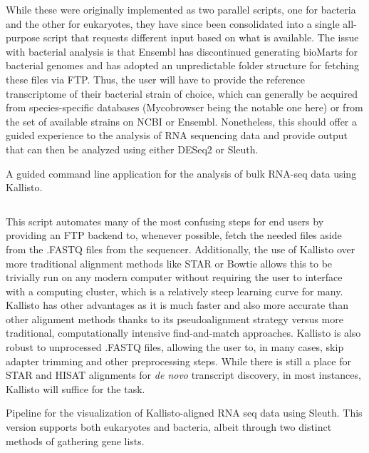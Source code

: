 While these were originally implemented as two parallel scripts, one for bacteria and the other for eukaryotes, they have since been consolidated into a single all-purpose script that requests different input based on what is available. The issue with bacterial analysis is that Ensembl has discontinued generating bioMarts for bacterial genomes and has adopted an unpredictable folder structure for fetching these files via FTP. Thus, the user will have to provide the reference transcriptome of their bacterial strain of choice, which can generally be acquired from species-specific databases (Mycobrowser being the notable one here) or from the set of available strains on NCBI or Ensembl. Nonetheless, this should offer a guided experience to the analysis of RNA sequencing data and provide output that can then be analyzed using either DESeq2 or Sleuth.

\begin{code}
\caption{A guided command line application for the analysis of bulk RNA-seq data using Kallisto.}
\label{blinder}

\inputminted[breaklines,frame=single,fontsize=\small]{python}{source/allKallisto.py}

\end{code}

This script automates many of the most confusing steps for end users by providing an FTP backend to, whenever possible, fetch the needed files aside from the .FASTQ files from the sequencer. Additionally, the use of Kallisto over more traditional alignment methods like STAR or Bowtie allows this to be trivially run on any modern computer without requiring the user to interface with a computing cluster, which is a relatively steep learning curve for many. Kallisto has other advantages as it is much faster and also more accurate than other alignment methods thanks to its pseudoalignment strategy versus more traditional, computationally intensive find-and-match approaches. Kallisto is also robust to unprocessed .FASTQ files, allowing the user to, in many cases, skip adapter trimming and other preprocessing steps. While there is still a place for STAR and HISAT alignments for \textit{de novo} transcript discovery, in most instances, Kallisto will suffice for the task. 

\begin{code}
\caption{Pipeline for the visualization of Kallisto-aligned RNA seq data using Sleuth. This version supports both eukaryotes and bacteria, albeit through two distinct methods of gathering gene lists.}
\label{blinder}

\inputminted[breaklines,frame=single,fontsize=\small]{r}{source/sleuther.R}

\end{code}

